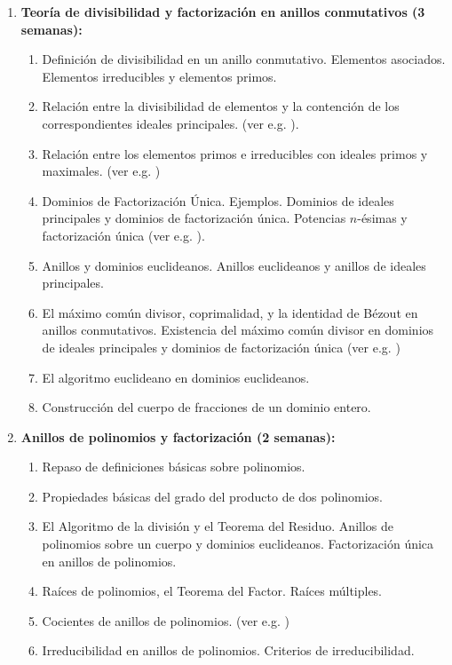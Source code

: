 \begin{refsection}
\begin{enumerate}
\item \textbf{Teoría de divisibilidad y factorización en anillos conmutativos (3 semanas):} 
\begin{enumerate}
    \item Definición de divisibilidad en un anillo conmutativo. Elementos asociados. Elementos irreducibles y elementos primos.
    \item Relación entre la divisibilidad de elementos y la contención de los correspondientes ideales principales. (ver e.g. \cite[Teorema II.3.2, pág. 136]{Hun80}).
    \item Relación entre los elementos primos e irreducibles con ideales primos y maximales. (ver e.g. \cite[Teorema II.3.4, pág. 136]{Hun80})
    \item Dominios de Factorización Única. Ejemplos. Dominios de ideales principales y dominios de factorización única. Potencias $n$-ésimas y factorización única (ver e.g. \cite[Lema 6.41, pág. 120]{Alu21}).
    \item Anillos y dominios euclideanos. Anillos euclideanos y anillos de ideales principales. 
    \item El máximo común divisor, coprimalidad, y la identidad de Bézout en anillos conmutativos. Existencia del máximo común divisor en dominios de ideales principales y dominios de factorización única (ver e.g. \cite[Teorema II.3.11, pág. 140]{Hun80})
    \item El algoritmo euclideano en dominios euclideanos.
    \item Construcción del cuerpo de fracciones de un dominio entero.
\end{enumerate}

\item \textbf{Anillos de polinomios y factorización (2 semanas):} 
\begin{enumerate}
    \item Repaso de definiciones básicas sobre polinomios.
    \item Propiedades básicas del grado del producto de dos polinomios.
    \item El Algoritmo de la división y el Teorema del Residuo. Anillos de polinomios sobre un cuerpo y dominios euclideanos. Factorización única en anillos de polinomios.
    \item Raíces de polinomios, el Teorema del Factor. Raíces múltiples.
    \item Cocientes de anillos de polinomios. (ver e.g. \cite[Corolario 7.10 y Teorema 7.11, pág. 135]{Alu21})
    \item Irreducibilidad en anillos de polinomios. Criterios de irreducibilidad. 
\end{enumerate}


\end{enumerate}
\end{refsection}
